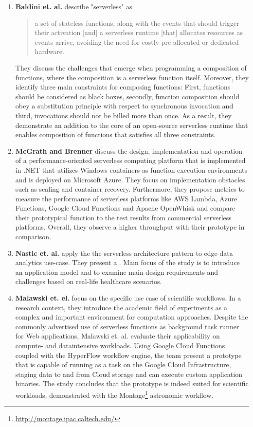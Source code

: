 \begin{enumerate}
    \item 
        \textbf{Baldini et. al.} describe "serverless" as \blockquote{a set of stateless functions, along with the events that should trigger their activation [and] a serverless runtime [that] allocates resources as events arrive, avoiding the need for costly pre-allocated or dedicated hardware.} They discuss the challenges that emerge when programming a composition of functions, where the composition is a serverless function itself. Moreover, they identify three main constraints for composing functions: First, functions should be considered as black boxes, secondly, function composition should obey a substitution principle with respect to synchronous invocation and third,  invocations should not be billed more than once. As a result, they demonstrate an addition to the core of an open-source serverless runtime that enables composition of functions that satisfies all three constraints.\autocite{Baldini2017TheComputing}
    \item
        \textbf{McGrath and Brenner} discuss the design, implementation and operation of a performance-oriented serverless computing platform that is implemented in .NET that utilizes Windows containers as function execution environments and is deployed on Microsoft Azure. They focus on implementation obstacles such as scaling and container recovery. Furthermore, they propose metrics to measure the performance of serverless platforms like AWS Lambda, Azure Functions, Google Cloud Functions and Apache OpenWhisk and compare their prototypical function to the test results from commercial serverless platforms. Overall, they observe a higher throughput with their prototype in comparison.
    \item 
        \textbf{Nastic et. al.} apply the the serverless architecture pattern to edge-data analytics use-case. They present a . Main focus of the study is to introduce an application model and to examine main design requirements and challenges based on real-life healthcare scenarios.\autocite{Nastic2017AComputing}
    \item 
        \textbf{Malawski et. el.} focus on the specific use case of scientific workflows. In a research context, they introduce the academic field of experiments as a complex and important environment for computation approaches. Despite the commonly advertised use of serverless functions as background task runner for Web applications, Malawski et. al. evaluate their applicability on compute- and dataintensive workloads. Using Google Cloud Functions coupled with the HyperFlow workflow engine, the team present a prototype that is capable of running as a task on the Google Cloud Infrastructure, staging data to and from Cloud storage and can execute custom application binaries. The study concludes that the prototype is indeed suited for scientific workloads, demonstrated with the Montage\footnote{\url{http://montage.ipac.caltech.edu/}} astronomic workflow.\autocite{Malawski2017ServerlessFunctions}

\end{enumerate}
